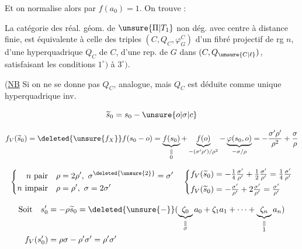 Et on normalise alors par $f(a_0)=1$. On trouve :

La catégorie des réal. géom. de $\unsure{\Pi|T_1}$ non dég. avec centre à distance finie, est équivalente à celle des triples $(C,Q_C,\varphi_G^C)$ d'un fibré projectif de rg $n$, d'une hyperquadrique $Q_C$ de $C$, d'une rep. de $G$ dans $(C,Q_{\unsure{C|\ell}})$, satisfaisant les conditions $1^\circ)$ à $3^\circ)$.


(\uline{NB} Si on ne se donne pas $Q_C$,  analogue, mais  $Q_C$ est déduite  comme unique hyperquadrique inv.

\[
\widetilde{s}_0=s_0-\unsure{o|\sigma|c}
\]

\deleted{\[
\begin{aligned}
s'_0&=\rho\widetilde{s}_0,\\
f_V(s'_0)&
\end{aligned}
\]}

\[
f_V(\widetilde{s}_0)=\deleted{\unsure{f_{X}}}f(s_0-o)=
 \underbrace{f(s_0)}_{\substack{\Vert\\0}}+\underbrace{f(o)}_{-(\sigma'\rho')/\rho^2}-
 \underbrace{\varphi(s_0,o)}_{-\sigma/\rho}
=-\frac{\sigma'\rho'}{\rho^2}+\frac{\sigma}{\rho}
\]

\[
\left\{\begin{aligned}
n\text{ pair}\quad&\rho=2\rho',\ \sigma^{\deleted{\unsure{2}}}=\sigma'\\
n\text{ impair}\quad&\rho=\rho',\ \sigma=2\sigma'
\end{aligned}\right.\quad
\left\{\begin{aligned}
f_V(\widetilde{s}_0)&=-\tfrac14\tfrac{\sigma'}{\rho'}+\tfrac12\tfrac{\sigma'}{\rho'}=\tfrac14\tfrac{\sigma'}{\rho'}\\
f_V(\widetilde{s}_0)&=-\tfrac{\sigma'}{\rho'}+2\tfrac{\sigma'}{\rho'}=\tfrac{\sigma'}{\rho'}
\end{aligned}\right.
\]

\[
\begin{aligned}
\text{Soit}\quad s'_0&=-\rho\widetilde{s}_0=\deleted{\unsure{-}}
(\underbrace{\zeta_0}_{\substack{\Vert\\\sigma}}a_0+\zeta_1a_1+\cdots+\underbrace{\zeta_n}_{\substack{\Vert\\1}}a_n)\\
f_V(s'_0)&=\rho\sigma-\rho'\sigma'=\rho'\sigma'
\end{aligned}
\]

